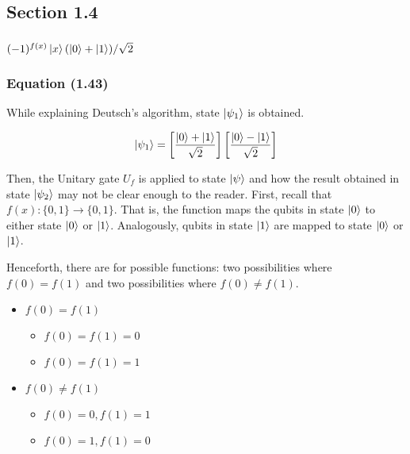 \subsection{Section 1.4}
\subsubsection[General formula of applying Unitary Operator to the intermediate state 2]
{$(-1)^{f(x)}\ket{x}(\ket{0} + \ket{1})/\sqrt{2}$}

\subsubsection{Equation (1.43)}

While explaining Deutsch's algorithm, state \( \ket{\psi_1} \) is obtained.

\[
\ket{\psi_1} = \left[ \frac{\ket{0} + \ket{1}}{\sqrt{2}} \right]
    \left[ \frac{\ket{0} - \ket{1}}{\sqrt{2}} \right]
\]

Then, the Unitary gate \(U_f\) is applied to state \(\ket{\psi}\) and how the result obtained in state \(\ket{\psi_2}\) may not be clear enough to the reader. First, recall that \(f(x) : \{0, 1\} \to \{0, 1\}\). That is, the function maps the qubits in state \(\ket{0}\) to either state \(\ket{0}\) or \(\ket{1}\). Analogously, qubits in state \(\ket{1}\) are mapped to state \(\ket{0}\) or \(\ket{1}\).

Henceforth, there are for possible functions: two possibilities where \(f(0) = f(1)\) and two possibilities where \(f(0) \neq f(1)\).

\begin{itemize}
    \item \(f(0) = f(1)\)
    \begin{itemize}
        \item \(f(0) = f(1) = 0\)
        \item \(f(0) = f(1) = 1\)
    \end{itemize}
    
    \item \(f(0) \neq f(1)\)
    \begin{itemize}
        \item \(f(0) = 0, f(1) = 1\)
        \item \(f(0) = 1, f(1) = 0\)
    \end{itemize}
\end{itemize}

